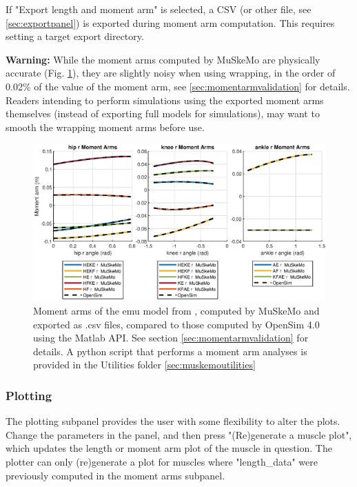\documentclass{article}
\begin{document}
If "Export length and moment arm" is selected, a CSV (or other file, see \ref{sec:exportpanel}) is exported during moment arm computation. This requires setting a target export directory.

\textbf{Warning:} While the moment arms computed by MuSkeMo are physically accurate (Fig. \ref{fig:momentarmscombined}), they are slightly noisy when using wrapping, in the order of 0.02\% of the value of the moment arm, see \ref{sec:momentarmvalidation} for details. Readers intending to perform simulations using the exported moment arms themselves (instead of exporting full models for simulations), may want to smooth the wrapping moment arms before use.

\begin{figure}[htbp]
    \centering
    \includegraphics[width=1\textwidth]{figures/HKA_momentarms_emu.eps} %
    \caption{Moment arms of the emu model from \cite{vanbijlertMusclecontrolledPhysicsSimulations2024a}, computed by MuSkeMo and exported as .csv files, compared to those computed by OpenSim 4.0 using the Matlab API. See section \ref{sec:momentarmvalidation} for details. A python script that performs a moment arm analyses is provided in the Utilities folder \ref{sec:muskemoutilities}}
    \label{fig:momentarmscombined}
\end{figure}

\subsubsection{Plotting}
\label{sec:plotting}

The plotting subpanel provides the user with some flexibility to alter the plots. Change the parameters in the panel, and then press "(Re)generate a muscle plot", which updates the length or moment arm plot of the muscle in question. The plotter can only (re)generate a plot for muscles where "length\_data" were previously computed in the moment arms subpanel.
\end{document}
